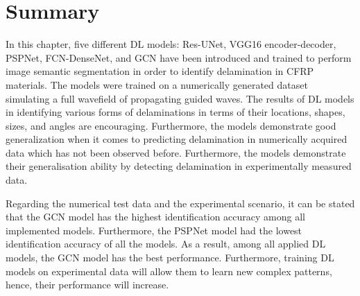 \section*{Summary}
\label{conclusion}
In this chapter, five different DL models: Res-UNet, VGG16 encoder-decoder, PSPNet, FCN-DenseNet, and GCN have been introduced and trained to perform image semantic segmentation in order to identify delamination in CFRP materials.
The models were trained on a numerically generated dataset simulating a full wavefield of propagating guided waves.
The results of DL models in identifying various forms of delaminations in terms of their locations, shapes, sizes, and angles are encouraging.
Furthermore, the models demonstrate good generalization when it comes to predicting delamination in numerically acquired data which has not been observed before.
Furthermore, the models demonstrate their generalisation ability by detecting delamination in experimentally measured data.

Regarding the numerical test data and the experimental scenario, it can be stated that the GCN model has the highest identification accuracy among all implemented models.
Furthermore, the PSPNet model had the lowest identification accuracy of all the models.
As a result, among all applied DL models, the GCN model has the best performance.
Furthermore, training DL models on experimental data will allow them to learn new complex patterns, hence, their performance will increase.
